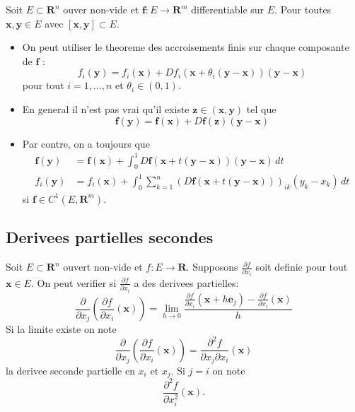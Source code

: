 \begin{theorem}
Soit $E\subset \mathbf{R}^{n}$ ouver non-vide et $\boldsymbol{f}:E\to \mathbf{R}^{m}$ differentiable sur $E$. Pour toutes $\boldsymbol{x},\boldsymbol{y}\in E$ avec $[\boldsymbol{x},\boldsymbol{y}]\subset E$. 
\begin{itemize}
\item On peut utiliser le theoreme des accroisements finis sur chaque composante de $\boldsymbol{f}$ :
$$
f_{i}(\boldsymbol{y})=f_{i}(\boldsymbol{x})+Df_{i}(\boldsymbol{x}+\theta _{i}(\boldsymbol{y}-\boldsymbol{x}))(\boldsymbol{y}-\boldsymbol{x})
$$
pour tout $i=1,\dots,n$ et $\theta _{i}\in(0,1)$.

\item En general il n'est pas vrai qu'il existe $\boldsymbol{z}\in(\boldsymbol{x},\boldsymbol{y})$ tel que 
$$
\boldsymbol{f}(\boldsymbol{y})=\boldsymbol{f}(\boldsymbol{x})+D\boldsymbol{f}(\boldsymbol{z})(\boldsymbol{y}-\boldsymbol{x})
$$
\item Par contre, on a toujours que
\begin{align*}
\boldsymbol{f}(\boldsymbol{y}) & =\boldsymbol{f}(\boldsymbol{x})+\int_{0}^{1} D\boldsymbol{f}(\boldsymbol{x}+t(\boldsymbol{y}-\boldsymbol{x}))(\boldsymbol{y}-\boldsymbol{x}) \, dt  \\
 f_{i}(\boldsymbol{y}) & =f_{i}(\boldsymbol{x})+\int_{0}^{1} \sum_{k=1}^{n} (D\boldsymbol{f}(\boldsymbol{x}+t(\boldsymbol{y}-\boldsymbol{x})))_{ik}(y_{k}-x_{k}) \, dt 
\end{align*}
si $\boldsymbol{f}\in C^{1}(E,\mathbf{R}^{m})$.
\end{itemize}
\end{theorem}

\subsection{Derivees partielles secondes}

Soit $E\subset \mathbf{R}^{n}$ ouvert non-vide et $f:E\to \mathbf{R}$. Supposons $\frac{ \partial f }{ \partial x_{i} }$ soit definie pour tout $\boldsymbol{x}\in E$. On peut verifier si $\frac{ \partial f }{ \partial x_{i} }$ a des derivees partielles:
$$
\frac{ \partial  }{ \partial x_{j} } \left( \frac{ \partial f }{ \partial x_{i} } (\boldsymbol{x}) \right)=\lim_{ h \to 0 } \frac{\frac{ \partial f }{ \partial x_{i} } (\boldsymbol{x}+h\boldsymbol{e}_{j})-\frac{ \partial f }{ \partial x_{i} }(\boldsymbol{x})}{h}
$$
Si la limite existe on note
$$
\frac{ \partial  }{ \partial x_{j} } \left( \frac{ \partial f }{ \partial x_{i} } (\boldsymbol{x}) \right)=\frac{ \partial^{2}f }{ \partial x_{j}\partial x_{i} }(\boldsymbol{x}) 
$$
la derivee seconde partielle en $x_{i}$ et $x_{j}$. Si $j=i$ on note $$\frac{ \partial^{2}f }{ \partial x_{i}^{2} }(\boldsymbol{x}).$$

